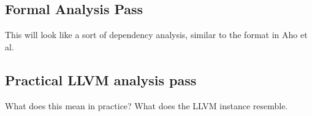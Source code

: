 
\subsection{Formal Analysis Pass}

This will look like a sort of dependency analysis, similar to the format in Aho et al.

\subsection{Practical LLVM analysis pass}
What does this mean in practice? What does the LLVM instance resemble.
